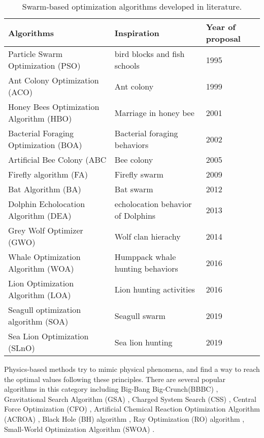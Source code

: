 \documentclass[../main.tex]{subfiles}
\begin{document}
\begin{table}[!t]
\caption{Swarm-based optimization algorithms developed in literature.}
\label{tbl_swarm_algos}
\centering
\begin{tabular}{|p{6cm}|p{4cm}|p{2cm}|}
 \hline
 Algorithms & Inspiration & Year of proposal  \\ 
 \hline
Particle Swarm Optimization (PSO) \cite{eberhart1995particle} & bird blocks and fish schools & 1995 \\ \hline
Ant Colony Optimization (ACO) \cite{dorigo1999ant} & Ant colony & 1999 \\ \hline
Honey Bees Optimization Algorithm (HBO) \cite{abbass2001mbo} & Marriage in honey bee & 2001 \\ \hline
Bacterial Foraging Optimization (BOA) \cite{passino2002biomimicry} & Bacterial foraging behaviors & 2002 \\ \hline
Artificial Bee Colony (ABC\cite{basturk2006artificial} & Bee colony & 2005 \\ \hline
Firefly algorithm (FA) \cite{yang2009firefly} & Firefly swarm & 2009 \\ \hline
Bat Algorithm (BA) \cite{yang2012bat} & Bat swarm & 2012 \\ \hline
Dolphin Echolocation Algorithm (DEA) \cite{kaveh2013new} & echolocation behavior of Dolphins & 2013 \\ \hline
Grey Wolf Optimizer (GWO) \cite{mirjalili2014grey} & Wolf clan hierachy & 2014 \\ \hline
Whale Optimization Algorithm (WOA) \cite{mirjalili2016whale} & Humppack whale hunting behaviors & 2016 \\ \hline
Lion Optimization Algorithm (LOA) \cite{yazdani2016lion} & Lion hunting activities & 2016 \\ \hline
Seagull optimization algorithm (SOA) \cite{dhiman2019seagull} & Seagull swarm & 2019 \\ \hline
Sea Lion Optimization (SLnO) \cite{masadeh2019sea} & Sea lion hunting & 2019 \\ \hline


 \hline
\end{tabular}
\end{table}
	
	Physics-based methods try to mimic physical phenomena, and find a way to reach the optimal values following these principles. There are several popular algorithms in this category including Big-Bang Big-Crunch(BBBC) \cite{erol2006new}, Gravitational Search Algorithm (GSA) \cite{rashedi2009gsa}, Charged System Search (CSS) \cite{kaveh2010novel}, Central Force Optimization (CFO) \cite{formato2007central}, Artificial Chemical Reaction Optimization Algorithm (ACROA) \cite{alatas2011acroa}, Black Hole (BH) algorithm \cite{hatamlou2013black}, Ray Optimization (RO) algorithm \cite{kaveh2012new}, Small-World Optimization Algorithm
(SWOA)  \cite{du2006small}.
	
\end{document}
